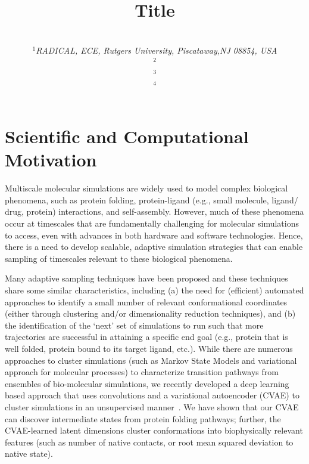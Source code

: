 \documentclass[conference,final]{IEEEtran}
\begin{document}
\title{Title}

\author{\\
   {\footnotesize{\emph{$^{1}$RADICAL, ECE, Rutgers University, Piscataway,NJ 08854, USA}}}\\
   \footnotesize{\emph{$^{2}$}}\\
   \footnotesize{\emph{$^{3}$}}\\
   \footnotesize{\emph{$^{4}$}\upp\upp\upp}
   }


\date{}
\maketitle

\section{Scientific  and Computational Motivation}

Multiscale molecular simulations are widely used to model complex biological phenomena, such as protein folding, protein-ligand (e.g., small molecule, ligand/ drug, protein) interactions, and self-assembly. However, much of these phenomena occur at timescales that are fundamentally challenging for molecular simulations to access, even with advances in both hardware and software technologies. Hence, there is a need to develop scalable, adaptive simulation strategies that can enable sampling of timescales relevant to these biological phenomena. 

Many adaptive sampling techniques have been proposed and these techniques share some similar characteristics, including (a) the need for (efficient) automated approaches to identify a small number of relevant conformational coordinates (either through clustering and/or dimensionality reduction techniques), and (b) the identification of the ‘next’ set of simulations to run such that more trajectories are successful in attaining a specific end goal (e.g., protein that is well folded, protein bound to its target ligand, etc.). While there are numerous approaches to cluster simulations (such as Markov State Models and variational approach for molecular processes) to characterize transition pathways from ensembles of bio-molecular simulations, we recently developed a deep learning based approach that uses convolutions and a variational autoencoder (CVAE) to cluster simulations in an unsupervised manner~\cite{bhowmik2018deep}. We have shown that our CVAE can discover intermediate states from protein folding pathways; further, the CVAE-learned latent dimensions cluster conformations into biophysically relevant features (such as number of native contacts, or root mean squared deviation to native state). 
\end{document}
